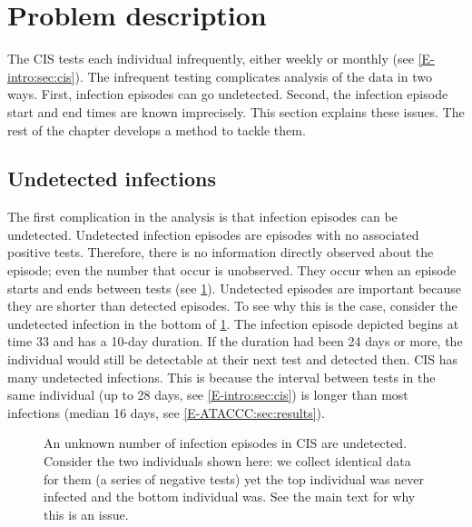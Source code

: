 \documentclass[thesis.tex]{subfiles}
\begin{document}
\section{Problem description} \label{perf-test:sec:problem}

The CIS tests each individual infrequently, either weekly or monthly (see \cref{E-intro:sec:cis}).
The infrequent testing complicates analysis of the data in two ways.
First, infection episodes can go undetected.
Second, the infection episode start and end times are known imprecisely.
This section explains these issues. The rest of the chapter develops a method to tackle  them.

\subsection{Undetected infections}

The first complication in the analysis is that infection episodes can be undetected.
Undetected infection episodes are episodes with no associated positive tests.
Therefore, there is no information directly observed about the episode; even the number that occur is unobserved.
They occur when an episode starts and ends between tests (see \cref{perf-test:fig:truncation}).
Undetected episodes are important because they are shorter than detected episodes.
To see why this is the case, consider the undetected infection in the bottom of \cref{perf-test:fig:truncation}.
The infection episode depicted begins at time 33 and has a 10-day duration.
If the duration had been 24 days or more, the individual would still be detectable at their next test and detected then.
CIS has many undetected infections.
This is because the interval between tests in the same individual (up to 28 days, see \cref{E-intro:sec:cis}) is longer than most infections (median 16 days, see \cref{E-ATACCC:sec:results}).
\begin{figure}
  \caption[Undetected episodes in CIS data]{An unknown number of infection episodes in CIS are undetected. Consider the two individuals shown here: we collect identical data for them (a series of negative tests) yet the top individual was never infected and the bottom individual was. See the main text for why this is an issue. \label{perf-test:fig:truncation}}
\end{figure}
\end{document}
